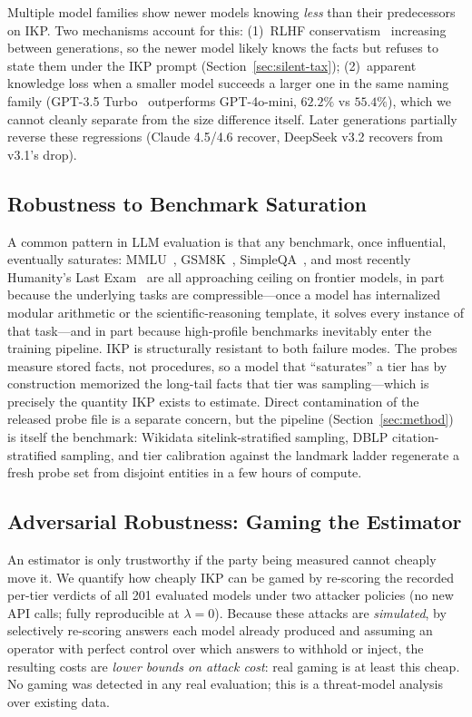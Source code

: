 \documentclass[11pt]{article}
\begin{document}
Multiple model families show newer models knowing \emph{less} than their predecessors on IKP. Two mechanisms account for this: (1)~RLHF conservatism~\citep{ouyang2022training} increasing between generations, so the newer model likely knows the facts but refuses to state them under the IKP prompt (Section~\ref{sec:silent-tax}); (2)~apparent knowledge loss when a smaller model succeeds a larger one in the same naming family (GPT-3.5 Turbo~\citep{brown2020language} outperforms GPT-4o-mini, $62.2\%$ vs $55.4\%$), which we cannot cleanly separate from the size difference itself. Later generations partially reverse these regressions (Claude 4.5/4.6 recover, DeepSeek v3.2 recovers from v3.1's drop).

\subsection{Robustness to Benchmark Saturation}
\label{sec:robustness-saturation}

A common pattern in LLM evaluation is that any benchmark, once influential, eventually saturates: MMLU~\citep{hendrycks2021measuring}, GSM8K~\citep{cobbe2021gsm8k}, SimpleQA~\citep{wei2024simpleqa}, and most recently Humanity's Last Exam~\citep{phan2025hle} are all approaching ceiling on frontier models, in part because the underlying tasks are compressible---once a model has internalized modular arithmetic or the scientific-reasoning template, it solves every instance of that task---and in part because high-profile benchmarks inevitably enter the training pipeline. IKP is structurally resistant to both failure modes. The probes measure stored facts, not procedures, so a model that ``saturates'' a tier has by construction memorized the long-tail facts that tier was sampling---which is precisely the quantity IKP exists to estimate. Direct contamination of the released probe file is a separate concern, but the pipeline (Section~\ref{sec:method}) is itself the benchmark: Wikidata sitelink-stratified sampling, DBLP citation-stratified sampling, and tier calibration against the landmark ladder regenerate a fresh probe set from disjoint entities in a few hours of compute.

\subsection{Adversarial Robustness: Gaming the Estimator}
\label{sec:adversarial}

An estimator is only trustworthy if the party being measured cannot cheaply move it. We quantify how cheaply IKP can be gamed by re-scoring the recorded per-tier verdicts of all 201 evaluated models under two attacker policies (no new API calls; fully reproducible at $\lambda=0$). Because these attacks are \emph{simulated}, by selectively re-scoring answers each model already produced and assuming an operator with perfect control over which answers to withhold or inject, the resulting costs are \emph{lower bounds on attack cost}: real gaming is at least this cheap. No gaming was detected in any real evaluation; this is a threat-model analysis over existing data.
\end{document}
